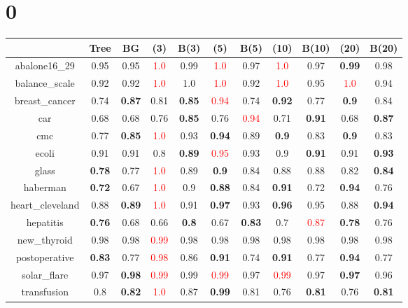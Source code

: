 \documentclass{article}%
\begin{document}
%
\normalsize%
\section*{0}%
\begin{tabular}{c|cccccccccc}%
\hline%
&Tree&BG&(3)&B(3)&(5)&B(5)&(10)&B(10)&(20)&B(20)\\%
\hline%
abalone16\_29&0.95&0.95&\textcolor{red}{ 
1.0
}&0.99&\textcolor{red}{ 
1.0
}&0.97&\textcolor{red}{ 
1.0
}&0.97&\textbf{0.99}&0.98\\%
\hline%
balance\_scale&0.92&0.92&\textcolor{red}{ 
1.0
}&1.0&\textcolor{red}{ 
1.0
}&0.92&\textcolor{red}{ 
1.0
}&0.95&\textcolor{red}{ 
1.0
}&0.94\\%
\hline%
breast\_cancer&0.74&\textbf{0.87}&0.81&\textbf{0.85}&\textcolor{red}{ 
0.94
}&0.74&\textbf{0.92}&0.77&\textbf{0.9}&0.84\\%
\hline%
car&0.68&0.68&0.76&\textbf{0.85}&0.76&\textcolor{red}{ 
0.94
}&0.71&\textbf{0.91}&0.68&\textbf{0.87}\\%
\hline%
cmc&0.77&\textbf{0.85}&\textcolor{red}{ 
1.0
}&0.93&\textbf{0.94}&0.89&\textbf{0.9}&0.83&\textbf{0.9}&0.83\\%
\hline%
ecoli&0.91&0.91&0.8&\textbf{0.89}&\textcolor{red}{ 
0.95
}&0.93&0.9&\textbf{0.91}&0.91&\textbf{0.93}\\%
\hline%
glass&\textbf{0.78}&0.77&\textcolor{red}{ 
1.0
}&0.89&\textbf{0.9}&0.84&0.88&0.88&0.82&\textbf{0.84}\\%
\hline%
haberman&\textbf{0.72}&0.67&\textcolor{red}{ 
1.0
}&0.9&\textbf{0.88}&0.84&\textbf{0.91}&0.72&\textbf{0.94}&0.76\\%
\hline%
heart\_cleveland&0.88&\textbf{0.89}&\textcolor{red}{ 
1.0
}&0.91&\textbf{0.97}&0.93&\textbf{0.96}&0.95&0.88&\textbf{0.94}\\%
\hline%
hepatitis&\textbf{0.76}&0.68&0.66&\textbf{0.8}&0.67&\textbf{0.83}&0.7&\textcolor{red}{ 
0.87
}&\textbf{0.78}&0.76\\%
\hline%
new\_thyroid&0.98&0.98&\textcolor{red}{ 
0.99
}&0.98&0.98&0.98&0.98&0.98&0.98&0.98\\%
\hline%
postoperative&\textbf{0.83}&0.77&\textcolor{red}{ 
0.98
}&0.86&\textbf{0.91}&0.74&\textbf{0.91}&0.77&\textbf{0.94}&0.77\\%
\hline%
solar\_flare&0.97&\textbf{0.98}&\textcolor{red}{ 
0.99
}&0.99&\textcolor{red}{ 
0.99
}&0.97&\textcolor{red}{ 
0.99
}&0.97&\textbf{0.97}&0.96\\%
\hline%
transfusion&0.8&\textbf{0.82}&\textcolor{red}{ 
1.0
}&0.87&\textbf{0.99}&0.81&0.76&\textbf{0.81}&0.76&\textbf{0.81}\\%

\end{tabular}
\end{document}
